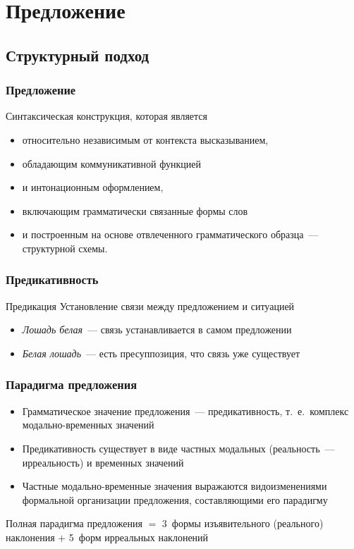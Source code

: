 \section{Предложение}

\subsection{Структурный подход}

\begin{frame}
  \frametitle{Предложение}

  Синтаксическая конструкция, которая является \begin{itemize}
    \item относительно независимым от контекста высказыванием,
    \item обладающим коммуникативной функцией
    \item и интонационным оформлением,
    \item включающим грамматически связанные формы слов
    \item и построенным на основе отвлеченного грамматического образца~--- структурной схемы.
  \end{itemize}
\end{frame}

\begin{frame}
  \frametitle{Предикативность}

  \begin{block}{Предикация}
    Установление связи между предложением и ситуацией
  \end{block}

  \vfill

  \begin{itemize}
    \item \textit{Лошадь белая}~--- связь устанавливается в самом предложении
    \item \textit{Белая лошадь}~--- есть пресуппозиция, что связь уже существует
  \end{itemize}
\end{frame}

\begin{frame}
  \frametitle{Парадигма предложения}

  \begin{itemize}
    \item Грамматическое значение предложения~--- предикативность, т.~е.\ комплекс модально-временных значений
    \item Предикативность существует в виде частных модальных (реальность~--- ирреальность) и временных значений
    \item Частные модально-временные значения выражаются видоизменениями формальной организации предложения, составляющими его парадигму
  \end{itemize}

  \vfill

  Полная парадигма предложения
  $=$ 3~формы изъявительного (реального) наклонения
  $+$ 5~форм ирреальных наклонений
\end{frame}

